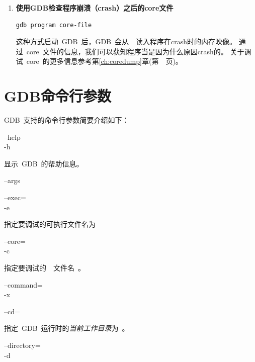 \begin{enumerate}
\item \textbf{使用GDB检查程序崩溃（crash）之后的core文件}
\begin{lstlisting}
gdb program core-file
\end{lstlisting}
这种方式启动~GDB~后，GDB~会从~~读入程序在crash时的内存映像。
通过~core~文件的信息，我们可以获知程序当是因为什么原因crash的。
关于调试~core~的更多信息参考第\ref{ch:coredump}章(第~\pageref{ch:coredump}~页)。

\end{enumerate}


\section{GDB命令行参数}

GDB~支持的命令行参数简要介绍如下：

\noindent
--help\\
-h

显示~GDB~的帮助信息。

\noindent
--args


\noindent
--exec=\\
-e 

指定要调试的可执行文件名为

\noindent
--core=\\
-c 

指定要调试的~~文件名~。

\noindent
--command=\\
-x 


\noindent
--cd=

指定~GDB~运行时的\emph{当前工作目录}为~。

\noindent
--directory=\\
-d 

